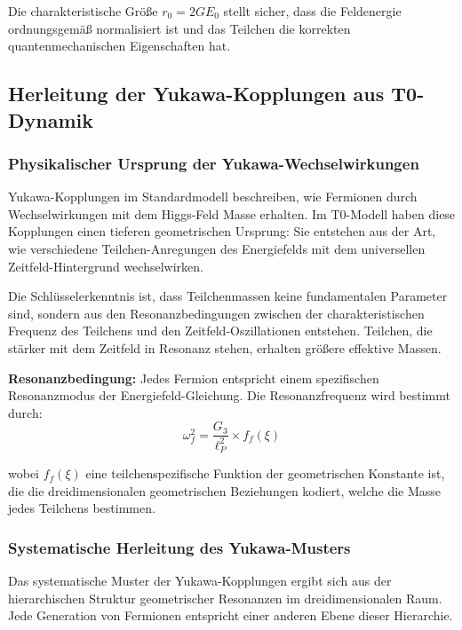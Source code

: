 \documentclass[12pt,a4paper]{article}
\newcommand{\xipar}{\xi}
\begin{document}
	Die charakteristische Größe $r_0 = 2GE_0$ stellt sicher, dass die Feldenergie ordnungsgemäß normalisiert ist und das Teilchen die korrekten quantenmechanischen Eigenschaften hat.
	
	\subsection{Herleitung der Yukawa-Kopplungen aus T0-Dynamik}
	
	\subsubsection{Physikalischer Ursprung der Yukawa-Wechselwirkungen}
	
	Yukawa-Kopplungen im Standardmodell beschreiben, wie Fermionen durch Wechselwirkungen mit dem Higgs-Feld Masse erhalten. Im T0-Modell haben diese Kopplungen einen tieferen geometrischen Ursprung: Sie entstehen aus der Art, wie verschiedene Teilchen-Anregungen des Energiefelds mit dem universellen Zeitfeld-Hintergrund wechselwirken.
	
	Die Schlüsselerkenntnis ist, dass Teilchenmassen keine fundamentalen Parameter sind, sondern aus den Resonanzbedingungen zwischen der charakteristischen Frequenz des Teilchens und den Zeitfeld-Oszillationen entstehen. Teilchen, die stärker mit dem Zeitfeld in Resonanz stehen, erhalten größere effektive Massen.
	
	\textbf{Resonanzbedingung:} Jedes Fermion entspricht einem spezifischen Resonanzmodus der Energiefeld-Gleichung. Die Resonanzfrequenz wird bestimmt durch:
	\begin{equation}
		\omega_f^2 = \frac{G_3}{\ell_P^2} \times f_f(\xipar)
	\end{equation}
	
	wobei $f_f(\xipar)$ eine teilchenspezifische Funktion der geometrischen Konstante ist, die die dreidimensionalen geometrischen Beziehungen kodiert, welche die Masse jedes Teilchens bestimmen.
	
	\subsubsection{Systematische Herleitung des Yukawa-Musters}
	
	Das systematische Muster der Yukawa-Kopplungen ergibt sich aus der hierarchischen Struktur geometrischer Resonanzen im dreidimensionalen Raum. Jede Generation von Fermionen entspricht einer anderen Ebene dieser Hierarchie.
	
\end{document}
